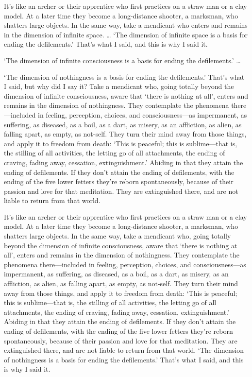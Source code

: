 \documentclass[12pt,openany]{book}%
\begin{document}
It’s like an archer or their apprentice who first practices on a straw man or a clay model. At a later time they become a long-distance shooter, a marksman, who shatters large objects. In the same way, take a mendicant who enters and remains in the dimension of infinite space. … ‘The dimension of infinite space is a basis for ending the defilements.’ That’s what I said, and this is why I said it. 

‘The dimension of infinite consciousness is a basis for ending the defilements.’ … 

‘The dimension of nothingness is a basis for ending the defilements.’ That’s what I said, but why did I say it? Take a mendicant who, going totally beyond the dimension of infinite consciousness, aware that ‘there is nothing at all’, enters and remains in the dimension of nothingness. They contemplate the phenomena there—included in feeling, perception, choices, and consciousness—as impermanent, as suffering, as diseased, as a boil, as a dart, as misery, as an affliction, as alien, as falling apart, as empty, as not-self. They turn their mind away from those things, and apply it to freedom from death: ‘This is peaceful; this is sublime—that is, the stilling of all activities, the letting go of all attachments, the ending of craving, fading away, cessation, extinguishment.’ Abiding in that they attain the ending of defilements. If they don’t attain the ending of defilements, with the ending of the five lower fetters they’re reborn spontaneously, because of their passion and love for that meditation. They are extinguished there, and are not liable to return from that world. 

It’s like an archer or their apprentice who first practices on a straw man or a clay model. At a later time they become a long-distance shooter, a marksman, who shatters large objects. In the same way, take a mendicant who, going totally beyond the dimension of infinite consciousness, aware that ‘there is nothing at all’, enters and remains in the dimension of nothingness. They contemplate the phenomena there—included in feeling, perception, choices, and consciousness—as impermanent, as suffering, as diseased, as a boil, as a dart, as misery, as an affliction, as alien, as falling apart, as empty, as not-self. They turn their mind away from those things, and apply it to freedom from death: ‘This is peaceful; this is sublime—that is, the stilling of all activities, the letting go of all attachments, the ending of craving, fading away, cessation, extinguishment.’ Abiding in that they attain the ending of defilements. If they don’t attain the ending of defilements, with the ending of the five lower fetters they’re reborn spontaneously, because of their passion and love for that meditation. They are extinguished there, and are not liable to return from that world. ‘The dimension of nothingness is a basis for ending the defilements.’ That’s what I said, and this is why I said it. 
\end{document}

